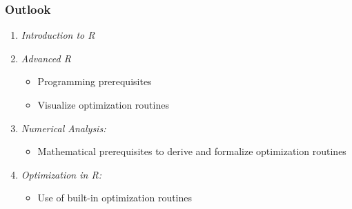 \documentclass[%
  final,
  11pt, 
  show notes, %
  t, %
  fleqn, %
]{beamer}
\begin{document}
\begin{frame}
  \frametitle{Outlook}
\begin{enumerate}
\item \emph{Introduction to R}
\item \emph{Advanced R} 
\begin{itemize}
\item Programming prerequisites 
\item Visualize optimization routines
\end{itemize}
\item \emph{Numerical Analysis:} 
\begin{itemize}
\item Mathematical prerequisites to derive and formalize optimization routines
\end{itemize}
\item \emph{Optimization in R:}
\begin{itemize} 
\item Use of built-in optimization routines
\end{itemize}
\end{enumerate}
\end{frame}
\end{document}
